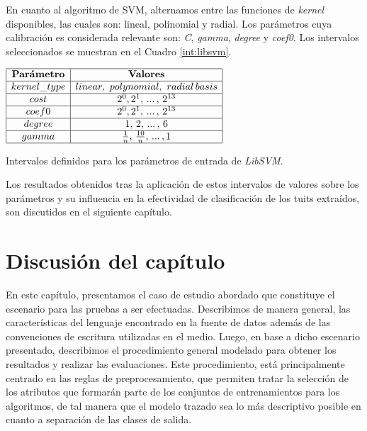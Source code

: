 En cuanto al algoritmo de SVM, alternamos entre las funciones de \textit{kernel} disponibles, las cuales son: lineal, polinomial y radial. Los par\'ametros cuya calibraci\'on es considerada relevante son: \textit{C}, \textit{gamma}, \textit{degree} y \textit{coef0}. Los intervalos seleccionados se muestran en el Cuadro \ref{int:libsvm}.

\begin{table}[htb] 
\centering

$
\begin{array}{|c|c|}
      \hline
      \mathbf{Par\acute{a}metro}	& \mathbf{Valores}			\\
      \hline
      kernel\_type	& linear, \ polynomial, \ radial \, basis	\\
      \hline
      cost				& 2^{0}, 2^{1}, \, ... \, , \, 2^{13} 	\\
      \hline
      coef0				& 2^{0}, 2^{1}, \, ... \, , \, 2^{13} 	\\
      \hline
      degree			& 1, \, 2, \, ... \, , \, 6 		\\
      \hline
      gamma				& {1 \over n}, \, {10 \over n}, \, ... \, , 1 \\
      \hline
\end{array}
$

\caption{Intervalos definidos para los par\'ametros de entrada de \textit{LibSVM}.}
\label{int:libsvm}
\end{table}

Los resultados obtenidos tras la aplicaci\'on de estos intervalos de valores sobre los par\'ametros y su influencia en la efectividad de clasificaci\'on de los tuits extra\'idos, son discutidos en el siguiente cap\'itulo.

\section{Discusi\'on del cap\'itulo}
En este cap\'itulo, presentamos el caso de estudio abordado que constituye el escenario para las pruebas a ser efectuadas. Describimos de manera general, las caracter\'isticas del lenguaje encontrado en la fuente de datos adem\'as de las convenciones de escritura utilizadas en el medio. Luego, en base a dicho escenario presentado, describimos el procedimiento general modelado para obtener los resultados y realizar las evaluaciones. Este procedimiento, est\'a principalmente centrado en las reglas de preprocesamiento, que permiten tratar la selecci\'on de los atributos que formar\'an parte de los conjuntos de entrenamientos para los algoritmos, de tal manera que el modelo trazado sea lo m\'as descriptivo posible en cuanto a separaci\'on de las clases de salida.
\newline

